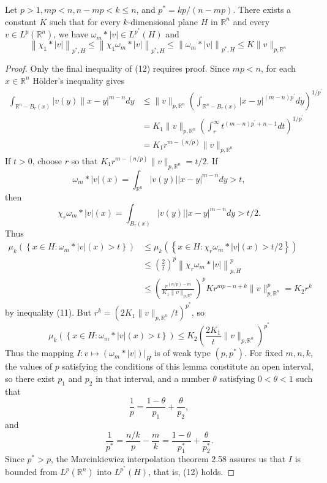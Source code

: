 \begin{lemma}
  Let $p>1, m p<n, n-m p<k \leq n$, and $p^*=k p /(n-m p)$. There exists a constant $K$ such that for every $k$-dimensional plane $H$ in $\mathbb{R}^n$ and every $v \in L^p\left(\mathbb{R}^n\right)$, we have $\omega_m *|v| \in L^{p^*}(H)$ and
  \[
  \left\|\chi_1 *|v|\right\|_{p^*, H} \leq\left\|\chi_1 \omega_m *|v|\right\|_{p^*, H} \leq\left\|\omega_m *|v|\right\|_{p^*, H} \leq K\|v\|_{p, \mathbb{R}^n}
  \]
\end{lemma}

\begin{proof}
  Only the final inequality of (12) requires proof. Since $m p<n$, for each $x \in \mathbb{R}^n$ Hölder's inequality gives
  \[
  \begin{aligned}
  \int_{\mathbb{R}^n-B_r(x)}|v(y) \| x-y|^{m-n} d y & \leq\|v\|_{p, \mathbb{R}^n}\left(\int_{\mathbb{R}^n-B_r(x)}|x-y|^{(m-n) p^{\prime}} d y\right)^{1 / p^{\prime}} \\
  & =K_1\|v\|_{p, \mathbb{R}^n}\left(\int_r^{\infty} t^{(m-n) p^{\prime}+n-1} d t\right)^{1 / p^{\prime}} \\
  & =K_1 r^{m-(n / p)}\|v\|_{p, \mathbb{R}^n}
  \end{aligned}
  \]
  If $t>0$, choose $r$ so that $K_1 r^{m-(n / p)}\|v\|_{p, \mathbb{R}^n}=t / 2$. If
  \[
  \omega_m *|v|(x)=\int_{\mathbb{R}^n}|v(y)||x-y|^{m-n} d y>t,
  \]
  then
  \[
  \chi_r \omega_m *|v|(x)=\int_{B_r(x)}|v(y)||x-y|^{m-n} d y>t / 2 .
  \]
  Thus
  \[
  \begin{aligned}
  \mu_k\left(\left\{x \in H: \omega_m *|v|(x)>t\right\}\right) & \leq \mu_k\left(\left\{x \in H: \chi_r \omega_m *|v|(x)>t / 2\right\}\right) \\
  & \leq\left(\frac{2}{t}\right)^p\left\|\chi_r \omega_m *|v|\right\|_{p, H}^p \\
  & \leq\left(\frac{r^{(n / p)-m}}{K_1\|v\|_{p, \mathbb{R}^n}}\right)^p K r^{m p-n+k}\|v\|_{p, \mathbb{R}^n}^p=K_2 r^k
  \end{aligned}
  \]
  by inequality (11). But $r^k=\left(2 K_1\|v\|_{p, \mathbb{R}^n} / t\right)^{p^*}$, so
  \[
  \mu_k\left(\left\{x \in H: \omega_m *|v|(x)>t\right\}\right) \leq K_2\left(\frac{2 K_1}{t}\|v\|_{p, \mathbb{R}^n}\right)^{p^*}
  \]
  Thus the mapping $I:\left.v \mapsto\left(\omega_m *|v|\right)\right|_H$ is of weak type $\left(p, p^*\right)$.
  For fixed $m, n, k$, the values of $p$ satisfying the conditions of this lemma constitute an open interval, so there exist $p_1$ and $p_2$ in that interval, and a number $\theta$ satisfying $0<\theta<1$ such that
  \[
  \frac{1}{p}=\frac{1-\theta}{p_1}+\frac{\theta}{p_2},
  \]
  and
  \[
  \frac{1}{p^*}=\frac{n / k}{p}-\frac{m}{k}=\frac{1-\theta}{p_1^*}+\frac{\theta}{p_2^*}.
  \]
  Since $p^*>p$, the Marcinkiewicz interpolation theorem 2.58 assures us that $I$ is bounded from $L^p\left(\mathbb{R}^n\right)$ into $L^{p^*}(H)$, that is, (12) holds.
\end{proof}


